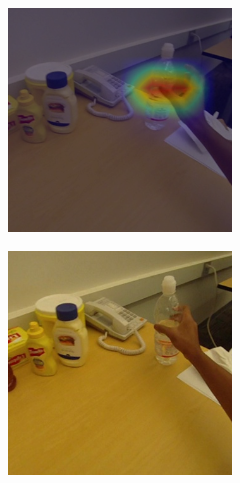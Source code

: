 \documentclass[10pt,twocolumn,hidelinks,letterpaper]{article}
\begin{document}
\begin{figure}[t]
\begin{subfigure}{.32\linewidth}
  \end{subfigure}
  \begin{subfigure}{.32\linewidth}
  	\includegraphics[width=\linewidth]{images/Cams3/S2_take_water/rgb0004_CAM_MS.png}
  \end{subfigure}
  \begin{subfigure}{.32\linewidth}
  	\includegraphics[width=\linewidth]{images/Cams3/S2_take_water/rgb0011.png}

\end{subfigure}
\end{figure}
\end{document}
